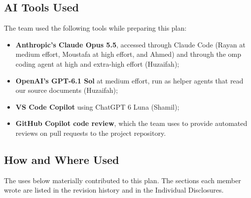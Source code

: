 \documentclass[12pt, titlepage]{article}
\begin{document}
\subsection{AI Tools Used}

The team used the following tools while preparing this plan:

\begin{itemize}
  \item \textbf{Anthropic's Claude Opus 5.5}, accessed through Claude Code
  (Rayan at medium effort, Moustafa at high effort, and Ahmed) and through the
  omp coding agent at high and extra-high effort (Huzaifah);
  \item \textbf{OpenAI's GPT-6.1 Sol} at medium effort, run as helper agents
  that read our source documents (Huzaifah);
  \item \textbf{VS Code Copilot} using ChatGPT 6 Luna (Shamil);
  \item \textbf{GitHub Copilot code review}, which the team uses to provide
  automated reviews on pull requests to the project repository.
\end{itemize}

\subsection{How and Where Used}

The uses below materially contributed to this plan. The sections each member
wrote are listed in the revision history and in the Individual Disclosures.
\end{document}
